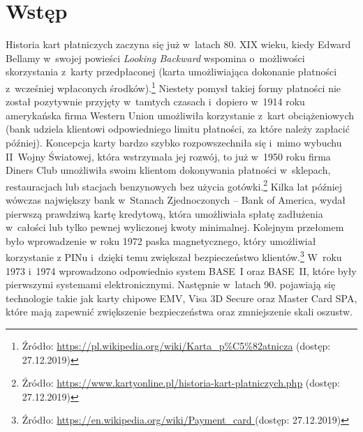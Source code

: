\documentclass[inzynierska]{pwr_wmat_praca_dyplomowa}
\theoremstyle{plain}
\numberwithin{theorem}{chapter}
\theoremstyle{definition}
\numberwithin{theorem}{chapter}
\begin{document}
	
\newcommand{\htx}{h_{\theta}(\boldsymbol{x_i})}
\newcommand{\es}{\mathcal{S}}
\newcommand{\ef}{\mathcal{F}}
\newcommand{\iks}{\boldsymbol{x}}
\newcommand{\yht}[1]{y_i^{(#1)}}
\newcommand{\ylab}[2]{\text{#1}_{\text{#2}}}

\newenvironment{talign}
{\align}
{\endalign}

\newenvironment{talign*}
{\csname align*\endcsname}
{\endalign}

\newenvironment{myitemize}
{\begin{easylist}[itemize]\ListProperties(Hang=true, Progressive=3ex, Style*=-)}
{\end{easylist}}


\frontmatter
\maketitle
\tableofcontents
\mainmatter



\chapter*{Wstęp}
 

Historia kart płatniczych zaczyna się już w~latach 80. XIX wieku, kiedy Edward Bellamy w~swojej powieści \textit{Looking Backward} wspomina o~możliwości skorzystania z~karty przedpłaconej (karta umożliwiająca dokonanie płatności z~wcześniej wpłaconych środków).\footnote{Źródło: \url{https://pl.wikipedia.org/wiki/Karta_p\%C5\%82atnicza} (dostęp: 27.12.2019)} Niestety pomysł takiej formy płatności nie został pozytywnie przyjęty w~tamtych czasach i~dopiero w~1914 roku amerykańska firma Western Union umożliwiła korzystanie z~kart obciążeniowych (bank udziela klientowi odpowiedniego limitu płatności, za które należy zapłacić później). Koncepcja karty bardzo szybko rozpowszechniła się i~mimo wybuchu II~Wojny Światowej, która wstrzymała jej rozwój, to już w~1950 roku firma Diners Club umożliwiła swoim klientom dokonywania płatności w~sklepach, restauracjach lub stacjach benzynowych bez użycia gotówki.\footnote{Źródło: \url{https://www.kartyonline.pl/historia-kart-platniczych.php} (dostęp: 27.12.2019)} Kilka lat później wówczas największy bank w~Stanach Zjednoczonych -- Bank of America, wydał pierwszą prawdziwą kartę kredytową, która umożliwiała spłatę zadłużenia w~całości lub tylko pewnej wyliczonej kwoty minimalnej. Kolejnym przełomem było wprowadzenie w roku 1972 paska magnetycznego, który umożliwiał korzystanie z PINu i~dzięki temu zwiększał bezpieczeństwo klientów.\footnote{Źródło: \url{https://en.wikipedia.org/wiki/Payment_card } (dostęp: 27.12.2019)} W~roku 1973 i~1974 wprowadzono odpowiednio system BASE~I oraz BASE~II, które były pierwszymi systemami elektronicznymi. Następnie w~latach 90. pojawiają się technologie takie jak karty chipowe EMV, Visa 3D Secure oraz Master Card SPA, które mają zapewnić zwiększenie bezpieczeństwa oraz zmniejszenie skali oszustw.
\end{document}
